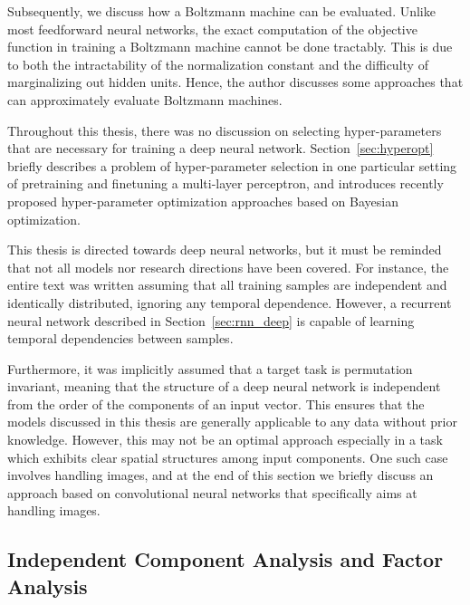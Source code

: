 \documentclass[dissertation,nocontribution,draft*]{aaltoseries}
\begin{document}
Subsequently, we discuss how a Boltzmann machine can be
evaluated. Unlike most feedforward neural
networks, the exact computation of the objective function in
training a Boltzmann machine cannot be done tractably. This
is due to both the intractability of the normalization
constant and the difficulty of marginalizing out hidden
units. Hence, the author discusses some approaches that can
approximately evaluate Boltzmann machines.

Throughout this thesis, there was no discussion on selecting
hyper-parameters that are necessary for training a deep
neural network. Section~\ref{sec:hyperopt} briefly describes
a problem of hyper-parameter selection in one particular
setting of pretraining and finetuning a multi-layer
perceptron, and introduces recently proposed
hyper-parameter optimization approaches based on Bayesian
optimization.

This thesis is directed towards deep neural networks, but it must be
reminded that not all models nor research directions have
been covered. For instance, the entire text was written
assuming that all training samples are independent and
identically distributed, ignoring any temporal dependence.
However, a recurrent neural network described in
Section~\ref{sec:rnn_deep} is capable of learning temporal
dependencies between samples.

Furthermore, it was implicitly assumed that a target task is
permutation invariant, meaning that the structure of a deep
neural network is independent from the order of the
components of an input vector. This ensures that the models
discussed in this thesis are generally applicable to any
data without prior knowledge. However, this may not be an
optimal approach especially in a task which exhibits clear
spatial structures among input components. One such case
involves handling images, and at the end of this section we
briefly discuss an approach based on convolutional neural
networks that specifically aims at handling images.



\subsection{Independent Component Analysis and Factor Analysis}
\label{sec:ica_fa}
\end{document}
